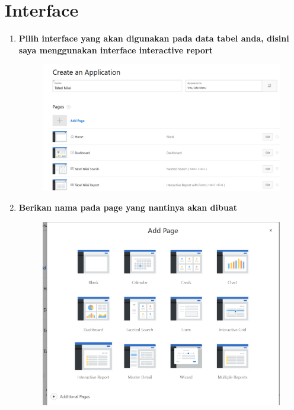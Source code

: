 \section{Interface}
\begin{enumerate}
\item \textbf{Pilih interface yang akan digunakan pada data tabel anda, disini saya menggunakan interface interactive report}
\begin{figure}[H]
    \centering
    \includegraphics[scale=0.3]{figures/18.png}
    \label{16}
\end{figure}


\item \textbf{Berikan nama pada page yang nantinya akan dibuat}
\begin{figure}[H]
    \centering
    \includegraphics[scale=0.3]{figures/19.png}
    \label{17}
\end{figure}



\end{enumerate}
